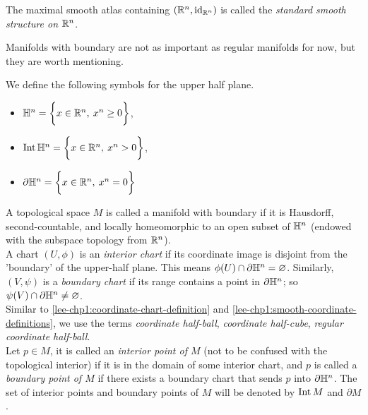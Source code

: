 \documentclass[../main-manifolds.tex]{subfiles}
\begin{document}
\begin{definition}\label{lee-chp1:standard-smooth-structure-realn}
    The maximal smooth atlas containing $({\mathbb{R}^n},\operatorname{id}_{{\mathbb{R}^n}})$ is called the \emph{standard smooth structure on ${\mathbb{R}^n}$}.
\end{definition}

Manifolds with boundary are not as important as regular manifolds for now, but they are worth mentioning.
\begin{definition}\label{lee-chp1:upper-half-plane-definitions}
    We define the following symbols for the upper half plane.
    \begin{itemize}
        \item ${\mathbb{H}^n} = \biggl\{{x\in{\mathbb{R}^n},\: x^n\geq 0}\biggr\}$,
        \item $\operatorname{Int}{\mathbb{H}^n} = \biggl\{{x\in{\mathbb{R}^n},\: x^n > 0}\biggr\}$,
        \item $\partial{\mathbb{H}^n} = \biggl\{{x\in{\mathbb{R}^n},\: x^n = 0}\biggr\}$
    \end{itemize}
\end{definition}
\begin{definition}\label{lee-chp1:manifolds-with-boundary-definition}
    A topological space $M$ is called a manifold with boundary if it is Hausdorff, second-countable, and locally homeomorphic to an open subset of ${\mathbb{H}^n}$ (endowed with the subspace topology from ${\mathbb{R}^n}$).\\

    A chart $(U,\phi)$ is an \emph{interior chart} if its coordinate image is disjoint from the 'boundary' of the upper-half plane. This means $\phi(U)\cap \partial{\mathbb{H}^n}=\varnothing$. Similarly, $(V,\psi)$ is a \emph{boundary chart} if its range contains a point in $\partial{\mathbb{H}^n}$; so $\psi(V)\cap\partial{\mathbb{H}^n}\neq\varnothing$.\\

    Similar to \cref{lee-chp1:coordinate-chart-definition} and \cref{lee-chp1:smooth-coordinate-definitions}, we use the terms \emph{coordinate half-ball}, \emph{coordinate half-cube}, \emph{regular coordinate half-ball}.\\

    Let $p\in M$, it is called an \emph{interior point of $M$} (not to be confused with the topological interior) if it is in the domain of some interior chart, and $p$ is called a \emph{boundary point of $M$} if there exists a boundary chart that sends $p$ into $\partial{\mathbb{H}^n}$. The set of interior points and boundary points of $M$ will be denoted by $\operatorname{Int} M$ and $\partial M$.
\end{definition}
\end{document}
